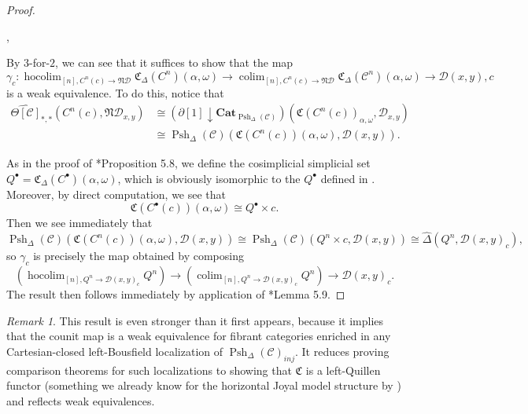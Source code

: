 \documentclass[leqno]{article}
\numberwithin{equation}{subsection}
\theoremstyle{plain}   %
\theoremstyle{remark}
\newtheorem{rem}[equation]{Remark}
\theoremstyle{plain}
\DeclareMathOperator*{\coliml}{colim}
\newcommand{\Cat}{\ensuremath{\mathbf{Cat}}}
\newcommand{\overcat}[2]{{\left(#1\downarrow #2\right)}}
\DeclareMathOperator*{\hocoliml}{hocolim}
\newcommand{\psh}[1]{\ensuremath{\widehat{#1}}}
\providecommand{\C}{}
\renewcommand{\C}{\ensuremath{\mathcal{C}}}
\newcommand{\cellset}{\ensuremath{\widehat{\Theta[\mathcal{C}]}}}
\newcommand{\spsh}{\ensuremath{\operatorname{Psh}_\Delta(\mathcal{C})}}
\begin{document}
\begin{proof}
\begin{center}
,
	\end{center}
	By \(3\)-for-\(2\), we can see that it suffices to show that the map
	\[\gamma_c: \hocoliml_{[n],C^n(c)\to \mathfrak{N}\mathcal{D}} \mathfrak{C}_\Delta(C^n)(\alpha,\omega) \to \coliml_{[n],C^n(c)\to \mathfrak{N}\mathcal{D}} \mathfrak{C}_\Delta(\C^n)(\alpha,\omega)\to \mathcal{D}(x,y),c\]
	is a weak equivalence.
	To do this, notice that
	\begin{align*}
		\cellset_{\ast,\ast}(C^n(c), \mathfrak{N}\mathcal{D}_{x,y}) & \cong \overcat{\partial[1]}{\Cat_{\spsh}}(\mathfrak{C}(C^n(c))_{\alpha,\omega},\mathcal{D}_{x,y}) \\
		& \cong \spsh(\mathfrak{C}(C^n(c))(\alpha,\omega), \mathcal{D}(x,y)).
	\end{align*}

	As in the proof of \cite{ds2}*{Proposition 5.8}, we define the cosimplicial simplicial set \(Q^\bullet = \mathfrak{C}_\Delta (C^\bullet)(\alpha,\omega)\), which is obviously isomorphic to the \(Q^\bullet\) defined in \cite{ds2}. Moreover, by direct computation, we see that
	\[\mathfrak{C}(C^\bullet(c))(\alpha,\omega)\cong Q^\bullet \times c.\]
	Then we see immediately that
	\[\spsh(\mathfrak{C}(C^n(c))(\alpha,\omega), \mathcal{D}(x,y)) \cong \spsh(Q^n \times c, \mathcal{D}(x,y))\cong \psh{\Delta}(Q^n, \mathcal{D}(x,y)_c),\]
	so \(\gamma_c\) is precisely the map obtained by composing
	\[\left(\hocoliml_{[n],Q^n\to \mathcal{D}(x,y)_c} Q^n\right) \to \left(\coliml_{[n],Q^n\to \mathcal{D}(x,y)_c} Q^n\right) \to \mathcal{D}(x,y)_c.\]
	The result then follows immediately by application of \cite{ds2}*{Lemma 5.9}.
\end{proof}

\begin{rem}
	This result is even stronger than it first appears, because it implies that the counit map is a weak equivalence for fibrant categories enriched in any Cartesian-closed left-Bousfield localization of \(\spsh_{inj}\).  It reduces proving comparison theorems for such localizations to showing that \(\mathfrak{C}\) is a left-Quillen functor (something we already know for the horizontal Joyal model structure by ) and reflects weak equivalences.
\end{rem}
\end{document}
